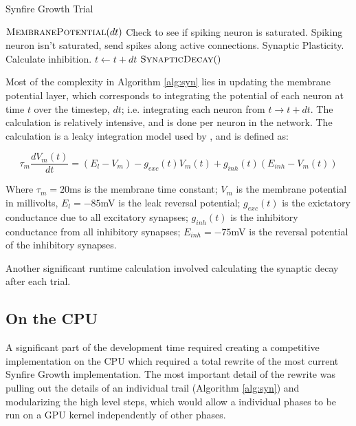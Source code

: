 \documentclass[a4paper]{article}
\begin{document}
\begin{algorithm}[H]
\caption{Synfire Growth Trial}
\label{alg:syn}
\begin{algorithmic}
	\State $\textsc{MembranePotential}(dt)$
		\State Check to see if spiking neuron is saturated.
		\State Spiking neuron isn't saturated, send spikes along active connections.
		\State Synaptic Plasticity.
	\EndFor
		\State Calculate inhibition.
	\EndFor
	\State $t \gets t + dt$
\EndWhile
\State $\textsc{SynapticDecay}()$
\end{algorithmic}
\end{algorithm}

Most of the complexity in Algorithm \ref{alg:syn} lies in updating the membrane potential layer, which corresponds to integrating the potential of each neuron at time $t$ over the timestep, $dt$; i.e. integrating each neuron from $t \rightarrow t + dt$. The calculation is relatively intensive, and is done per neuron in the network. The calculation is a leaky integration model used by \cite{synfire}, and is defined as:

$$\tau_m\frac{dV_m(t)}{dt} = (E_l - V_m) - g_{exc}(t)V_m(t)+g_{inh}(t)(E_{inh}-V_m(t))$$

Where $\tau_m = 20$ms is the membrane time constant; $V_m$ is the membrane potential in millivolts, $E_l = -85$mV is the leak reversal potential; $g_{exc}(t)$ is the exictatory conductance due to all excitatory synapses; $g_{inh}(t)$ is the inhibitory conductance from all inhibitory synapses; $E_{inh} = -75$mV is the reversal potential of the inhibitory synapses. 


Another significant runtime calculation involved calculating the synaptic decay after each trial.


\subsection{On the CPU}
A significant part of the development time required creating a competitive implementation on the CPU which required a total rewrite of the most current Synfire Growth implementation. The most important detail of the rewrite was pulling out the details of an individual trail (Algorithm \ref{alg:syn}) and modularizing the high level steps, which would allow a individual phases to be run on a GPU kernel independently of other phases.
\end{document}
